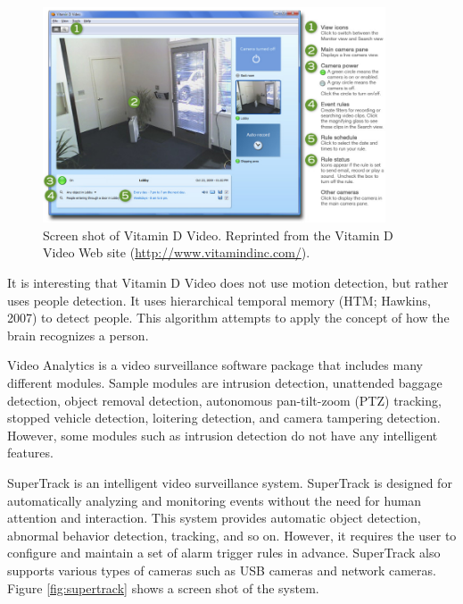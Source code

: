 \begin{figure}[t]
  \begin{center}
    \includegraphics[width=4in]{figures/vitamind.jpg}
    \caption[Screen shot of Vitamin D Video.]{\small Screen shot of
      Vitamin D Video. Reprinted from the Vitamin D Video Web site
      (\url{http://www.vitamindinc.com/}).}
    \label{fig:vitamind}
  \end{center}
\end{figure}

It is interesting that Vitamin D Video does not use motion detection,
but rather uses people detection. It uses hierarchical temporal memory
(HTM; Hawkins, 2007)\nocite{jeff07htm} to detect people. This
algorithm attempts to apply the concept of how the brain recognizes a
person.

Video Analytics  is a video surveillance software
package that includes many different modules.  Sample modules are
intrusion detection, unattended baggage detection, object removal
detection, autonomous pan-tilt-zoom (PTZ) tracking, stopped vehicle
detection, loitering detection, and camera tampering
detection. However, some modules such as intrusion detection do not
have any intelligent features.

SuperTrack  is an intelligent video surveillance
system. SuperTrack is designed for automatically analyzing and
monitoring events without the need for human attention and
interaction. This system provides automatic object detection, abnormal
behavior detection, tracking, and so on. However, it requires the user
to configure and maintain a set of alarm trigger rules in
advance. SuperTrack also supports various types of cameras such as USB
cameras and network cameras.  Figure \ref{fig:supertrack} shows a
screen shot of the system.

